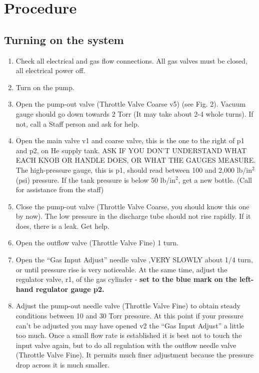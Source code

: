 \documentclass{../lab}
\begin{document}
\section{Procedure}

\subsection{Turning on the system}

\begin{enumerate}
    \item Check all electrical and gas flow connections. All gas valves must be closed, all electrical power off.

    \item Turn on the pump.

    \item Open the pump-out valve (Throttle Valve Coarse v5) (see Fig. 2). Vacuum gauge should go down towards 2 Torr (It may take about 2-4 whole turns). If not, call a Staff person and ask for help.

    \item Open the main valve v1 and coarse valve, this is the one to the right of p1 and p2, on He supply tank. ASK IF YOU DON'T UNDERSTAND WHAT EACH KNOB OR HANDLE DOES, OR WHAT THE GAUGES MEASURE. The high-pressure gauge, this is p1, should read between 100 and 2,000 lb/in$^2$ (psi) pressure. If the tank pressure is below 50 lb/in$^2$, get a new bottle. (Call for assistance from the staff)

    \item Close the pump-out valve (Throttle Valve Coarse, you should know this one by now). The low pressure in the discharge tube should not rise rapidly. If it does, there is a leak. Get help.

    \item Open the outflow valve (Throttle Valve Fine) 1 turn.

    \item Open the ``Gas Input Adjust'' needle valve ,VERY SLOWLY about 1/4 turn, or until pressure rise is very noticeable. At the same time, adjust the regulator valve, r1, of the gas cylinder - \textbf{set to the blue mark on the left-hand regulator gauge p2.}

    \item Adjust the pump-out needle valve (Throttle Valve Fine) to obtain steady conditions between 10 and 30 Torr pressure. At this point if your pressure can't be adjusted you may have opened v2 the ``Gas Input Adjust'' a little too much. Once a small flow rate is established it is best not to touch the input valve again, but to do all regulation with the outflow needle valve (Throttle Valve Fine). It permits much finer adjustment because the pressure drop across it is much smaller.


\end{enumerate}
\end{document}
